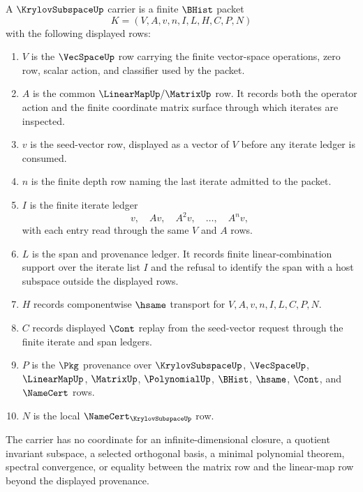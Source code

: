 \begin{definition}
\label{def:krylov-subspace-carrier}
A $\KrylovSubspaceUp$ carrier is a finite $\BHist$ packet
$$
K=(V,A,v,n,I,L,H,C,P,N)
$$
with the following displayed rows:
\begin{enumerate}
\item $V$ is the $\VecSpaceUp$ row carrying the finite vector-space operations, zero row, scalar action, and classifier used by the packet.
\item $A$ is the common $\LinearMapUp/\MatrixUp$ row. It records both the operator action and the finite coordinate matrix surface through which iterates are inspected.
\item $v$ is the seed-vector row, displayed as a vector of $V$ before any iterate ledger is consumed.
\item $n$ is the finite depth row naming the last iterate admitted to the packet.
\item $I$ is the finite iterate ledger
$$
v,\quad Av,\quad A^2v,\quad \ldots,\quad A^n v,
$$
with each entry read through the same $V$ and $A$ rows.
\item $L$ is the span and provenance ledger. It records finite linear-combination support over the iterate list $I$ and the refusal to identify the span with a host subspace outside the displayed rows.
\item $H$ records componentwise $\hsame$ transport for $V,A,v,n,I,L,C,P,N$.
\item $C$ records displayed $\Cont$ replay from the seed-vector request through the finite iterate and span ledgers.
\item $P$ is the $\Pkg$ provenance over $\KrylovSubspaceUp$, $\VecSpaceUp$, $\LinearMapUp$, $\MatrixUp$, $\PolynomialUp$, $\BHist$, $\hsame$, $\Cont$, and $\NameCert$ rows.
\item $N$ is the local $\NameCert_{\KrylovSubspaceUp}$ row.
\end{enumerate}
The carrier has no coordinate for an infinite-dimensional closure, a quotient invariant subspace, a selected orthogonal basis, a minimal polynomial theorem, spectral convergence, or equality between the matrix row and the linear-map row beyond the displayed provenance.
\end{definition}

